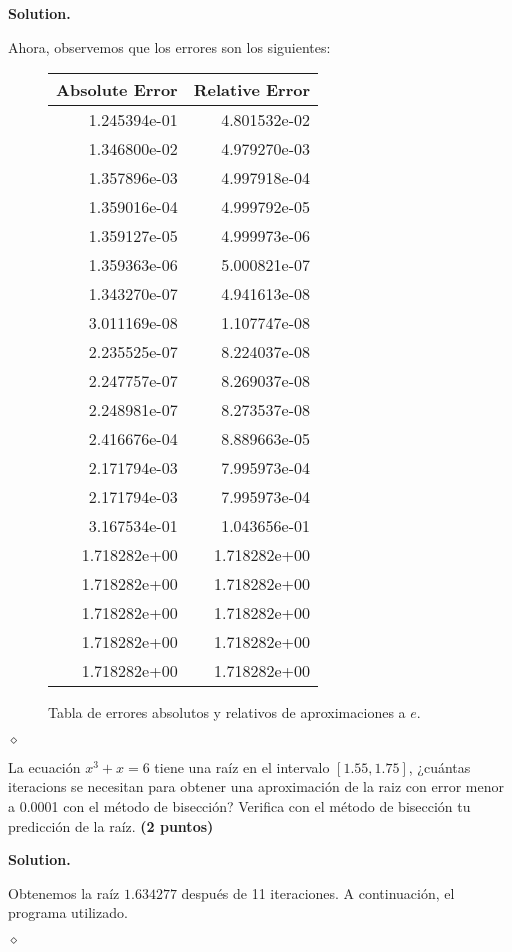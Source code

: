 \documentclass{article}
\theoremstyle{problemstyle}
\newenvironment{solution}{%
  \begin{mdframed}[linewidth=0.8pt,linecolor=Gray,backgroundcolor=Gray!5,roundcorner=5pt]%
  \noindent\textbf{Solution.}%
}{%
\hfill $ \diamond $ 
  \end{mdframed}%
}
\begin{document}
\begin{solution}
	Ahora, observemos que los errores son los siguientes:
	\begin{figure}[H]
		\begin{center}
			\begin{tabular}{r|r}
        \hline
				Absolute Error & Relative Error \\\hline
				1.245394e-01   & 4.801532e-02   \\
				1.346800e-02   & 4.979270e-03   \\
				1.357896e-03   & 4.997918e-04   \\
				1.359016e-04   & 4.999792e-05   \\
				1.359127e-05   & 4.999973e-06   \\
				1.359363e-06   & 5.000821e-07   \\
				1.343270e-07   & 4.941613e-08   \\
				3.011169e-08   & 1.107747e-08   \\
				2.235525e-07   & 8.224037e-08   \\
				2.247757e-07   & 8.269037e-08   \\
				2.248981e-07   & 8.273537e-08   \\
				2.416676e-04   & 8.889663e-05   \\
				2.171794e-03   & 7.995973e-04   \\
				2.171794e-03   & 7.995973e-04   \\
				3.167534e-01   & 1.043656e-01   \\
				1.718282e+00   & 1.718282e+00   \\
				1.718282e+00   & 1.718282e+00   \\
				1.718282e+00   & 1.718282e+00   \\
				1.718282e+00   & 1.718282e+00   \\
				1.718282e+00   & 1.718282e+00 
			\end{tabular}
		\end{center}
		\caption{Tabla de errores absolutos y relativos de aproximaciones a $e$.}\label{fig:errors}
	\end{figure}

\end{solution}

\begin{problem}
La ecuaci\'on $ x^3+x = 6 $ tiene una ra\'iz en el intervalo $ [1.55, 1.75] $, ¿cu\'antas iteracions se necesitan para obtener una aproximaci\'on de la raiz con error menor a 0.0001 con el m\'etodo de bisecci\'on? Verifica con el m\'etodo de bisecci\'on tu predicci\'on de la ra\'iz. \textbf{(2 puntos)}
\end{problem}
\begin{solution}
	Obtenemos la ra\'iz $ 1.634277 $ despu\'es de 11 iteraciones. A continuaci\'on, el programa utilizado.
	
\end{solution}
\end{document}
